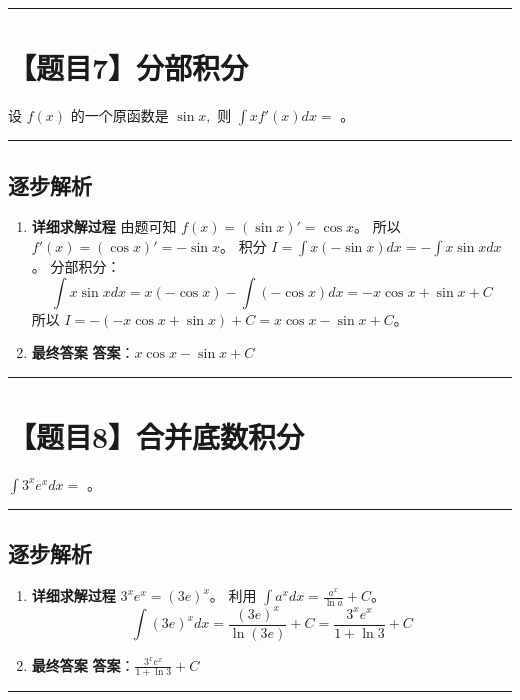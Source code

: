 \documentclass[UTF8]{ctexart}
\newenvironment{redenv}{\color{red}}{}
\newenvironment{detailedanalysis}{%
    \color{red}
    \begin{enumerate}[label=\textbf{第\arabic*步：}, leftmargin=*, align=left, itemsep=1.5ex]
}{%
    \end{enumerate}
}
\newcommand{\problemrule}{\noindent\rule{\textwidth}{1.5pt}\vspace{-0.8em}}
\newcommand{\analysisrule}{\noindent\rule{\textwidth}{0.8pt}\vspace{-0.8em}}
\newcommand{\blank}[1]{\underline{\hspace{#1}}}
\begin{document}
\problemrule
\section*{【题目7】分部积分}
设 $ f(x) $ 的一个原函数是 $ \sin x, $ 则 $ \int x f'(x)dx = $ \blank{2cm}。

\begin{redenv}
\analysisrule
\subsection*{逐步解析}

\begin{detailedanalysis}
\item \textbf{详细求解过程}
由题可知 $f(x) = (\sin x)' = \cos x$。
所以 $f'(x) = (\cos x)' = -\sin x$。
积分 $I = \int x (-\sin x) dx = - \int x \sin x dx$。
分部积分：
$$ \int x \sin x dx = x(-\cos x) - \int (-\cos x) dx = -x\cos x + \sin x + C $$
所以 $I = -(-x\cos x + \sin x) + C = x\cos x - \sin x + C$。

\item \textbf{最终答案}
\textbf{答案}：$ x\cos x - \sin x + C $
\end{detailedanalysis}
\end{redenv}

\problemrule
\section*{【题目8】合并底数积分}
$ \int 3^{x}e^{x}dx = $ \blank{2cm}。

\begin{redenv}
\analysisrule
\subsection*{逐步解析}

\begin{detailedanalysis}
\item \textbf{详细求解过程}
$3^x e^x = (3e)^x$。
利用 $\int a^x dx = \frac{a^x}{\ln a} + C$。
$$ \int (3e)^x dx = \frac{(3e)^x}{\ln(3e)} + C = \frac{3^x e^x}{1 + \ln 3} + C $$

\item \textbf{最终答案}
\textbf{答案}：$ \frac{3^x e^x}{1+\ln 3} + C $
\end{detailedanalysis}
\end{redenv}

\problemrule
\end{document}
